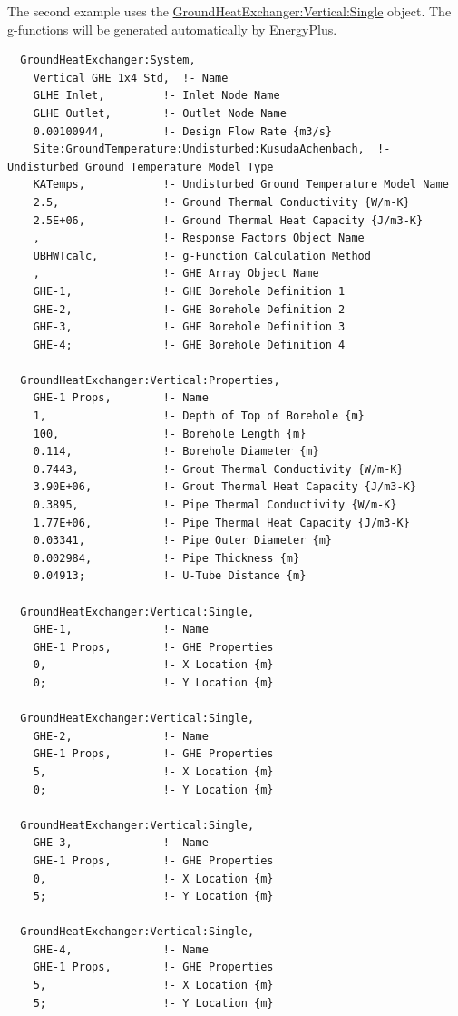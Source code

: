 The second example uses the \hyperref[groundheatexchangerverticalsingle]{GroundHeatExchanger:Vertical:Single} object. The g-functions will be generated automatically by EnergyPlus.

\begin{lstlisting}
  GroundHeatExchanger:System,
    Vertical GHE 1x4 Std,  !- Name
    GLHE Inlet,         !- Inlet Node Name
    GLHE Outlet,        !- Outlet Node Name
    0.00100944,         !- Design Flow Rate {m3/s}
    Site:GroundTemperature:Undisturbed:KusudaAchenbach,  !- Undisturbed Ground Temperature Model Type
    KATemps,            !- Undisturbed Ground Temperature Model Name
    2.5,                !- Ground Thermal Conductivity {W/m-K}
    2.5E+06,            !- Ground Thermal Heat Capacity {J/m3-K}
    ,                   !- Response Factors Object Name
    UBHWTcalc,          !- g-Function Calculation Method
    ,                   !- GHE Array Object Name
    GHE-1,              !- GHE Borehole Definition 1
    GHE-2,              !- GHE Borehole Definition 2
    GHE-3,              !- GHE Borehole Definition 3
    GHE-4;              !- GHE Borehole Definition 4

  GroundHeatExchanger:Vertical:Properties,
    GHE-1 Props,        !- Name
    1,                  !- Depth of Top of Borehole {m}
    100,                !- Borehole Length {m}
    0.114,              !- Borehole Diameter {m}
    0.7443,             !- Grout Thermal Conductivity {W/m-K}
    3.90E+06,           !- Grout Thermal Heat Capacity {J/m3-K}
    0.3895,             !- Pipe Thermal Conductivity {W/m-K}
    1.77E+06,           !- Pipe Thermal Heat Capacity {J/m3-K}
    0.03341,            !- Pipe Outer Diameter {m}
    0.002984,           !- Pipe Thickness {m}
    0.04913;            !- U-Tube Distance {m}

  GroundHeatExchanger:Vertical:Single,
    GHE-1,              !- Name
    GHE-1 Props,        !- GHE Properties
    0,                  !- X Location {m}
    0;                  !- Y Location {m}

  GroundHeatExchanger:Vertical:Single,
    GHE-2,              !- Name
    GHE-1 Props,        !- GHE Properties
    5,                  !- X Location {m}
    0;                  !- Y Location {m}

  GroundHeatExchanger:Vertical:Single,
    GHE-3,              !- Name
    GHE-1 Props,        !- GHE Properties
    0,                  !- X Location {m}
    5;                  !- Y Location {m}

  GroundHeatExchanger:Vertical:Single,
    GHE-4,              !- Name
    GHE-1 Props,        !- GHE Properties
    5,                  !- X Location {m}
    5;                  !- Y Location {m}
\end{lstlisting}

